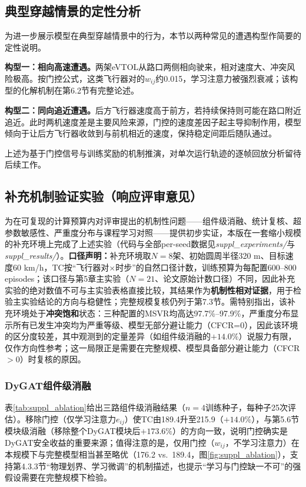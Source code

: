 \documentclass[12pt,a4paper,UTF8]{ctexart}
\begin{document}
\subsection{典型穿越情景的定性分析}

为进一步展示模型在典型穿越情景中的行为，本节以两种常见的遭遇构型作简要的定性说明。

\textbf{构型一：相向高速遭遇。}两架eVTOL从路口两侧相向驶来，相对速度大、冲突风险极高。按门控公式，这类飞行器对的$w_{ij}$约0.015，学习注意力被强烈衰减；该构型的化解机制在第6.2节有完整论述。

\textbf{构型二：同向追近遭遇。}后方飞行器速度高于前方，若持续保持则可能在路口附近追近。此时两机速度差是主要风险来源，门控的速度差因子起主导抑制作用，模型倾向于让后方飞行器收敛到与前机相近的速度，保持稳定间距后随队通过。

上述为基于门控信号与训练奖励的机制推演，对单次运行轨迹的逐帧回放分析留待后续工作。
\subsection{补充机制验证实验（响应评审意见）}

为在可复现的计算预算内对评审提出的机制性问题——组件级消融、统计复核、超参数敏感性、严重度分布与课程学习对照——提供初步实证，本版在一套缩小规模的补充环境上完成了上述实验（代码与全部per-seed数据见\textit{suppl\_experiments/}与\textit{suppl\_results/}）。\textbf{口径声明：}补充环境取$N=8$架、初始圆周半径320 m、目标速度60 km/h，TC按“飞行器对$\times$时步”的自然口径计数，训练预算为每配置600--800 episodes；该口径与第5章主实验（$N=21$、论文原始计数口径）不同，因此补充实验的绝对数值不可与主实验表格直接比较，其结果作为\textbf{机制性相对证据}，用于检验主实验结论的方向与稳健性；完整规模复核仍列于第7.3节。需特别指出，该补充环境处于\textbf{冲突饱和}状态：三种配置的MSVR均高达97.7\%--97.9\%，严重度分布显示所有已发生冲突均为严重等级、模型无部分避让能力（CFCR=0），因此该环境的区分度较差，其中观测到的定量差异（如组件级消融的$+14.0\%$）说服力有限，仅作方向性参考；这一局限正是需要在完整规模、模型具备部分避让能力（CFCR$>0$）时复核的原因。

\subsubsection{DyGAT组件级消融}

表\ref{tab:suppl_ablation}给出三路组件级消融结果（$n=4$训练种子，每种子25次评估）。移除门控（仅学习注意力$e_{ij}$）使TC由189.4升至215.9（$+14.0\%$），与第5.6节模块级消融（移除整个DyGAT模块后$+173.6\%$）的方向一致，说明门控确实是DyGAT安全收益的重要来源；值得注意的是，仅用门控（$w_{ij}$，不学习注意力）在本规模下与完整模型相当甚至略优（176.2 vs.\ 189.4，图\ref{fig:suppl_ablation}），支持第4.3.3节“物理划界、学习微调”的机制描述，也提示“学习与门控缺一不可”的强假设需要在完整规模下检验。
\end{document}
